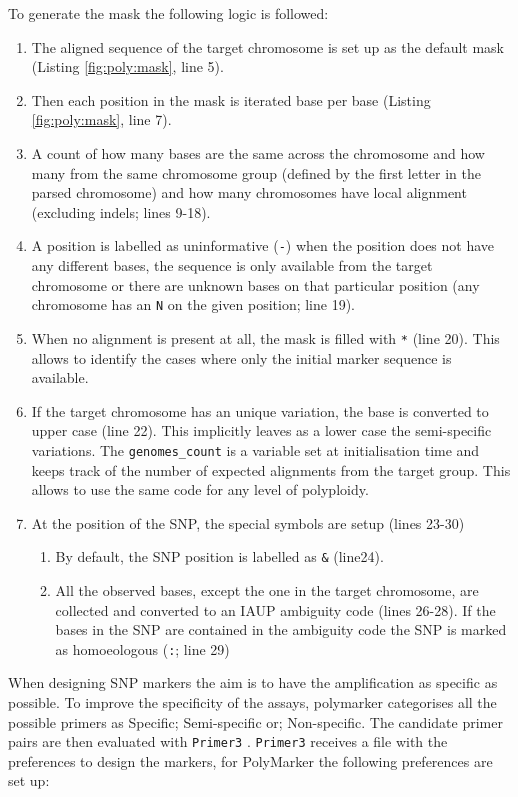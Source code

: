 To generate the mask the following logic is followed:
\begin{enumerate}
\item The aligned sequence of the target chromosome is set up as the default mask (Listing \ref{fig:poly:mask}, line 5).
\item Then each position in the mask is iterated base per base (Listing \ref{fig:poly:mask}, line 7).
\item A count of how many bases are the same across the chromosome and how many from the same chromosome group (defined by the first letter in the parsed chromosome) and how many chromosomes have local alignment (excluding \acrshort{indels}; lines 9-18).
\item  A position is labelled as uninformative (\verb|-|) when the position does not have any different bases, the sequence is only available from the target chromosome or there are unknown bases on that particular position (any chromosome has an \verb|N| on the given position; line 19).
\item When no alignment is present at all, the mask is filled with \verb|*| (line 20). This allows to identify the cases where only the initial marker sequence is available.
\item If the target chromosome has an unique variation, the base is converted to upper case (line 22). This implicitly leaves as a lower case the semi-specific variations. The \verb|genomes_count| is a variable set at initialisation time and keeps track of the number of expected alignments from the target group. This allows to use the same code for any level of polyploidy.  
\item At the position of the SNP, the special symbols are setup (lines 23-30)
\begin{enumerate}
\item By default, the SNP position is labelled as \verb|&| (line24).
\item All the observed bases, except the one in the target chromosome, are collected and converted to an IAUP ambiguity code \citep{Cornish-Bowden1985} (lines 26-28). If the bases in the SNP are contained in the ambiguity code the SNP is marked as homoeologous (\verb|:|; line 29)
\end{enumerate}
\end{enumerate}

When designing SNP markers the aim is to have the amplification as specific as possible. 
To improve the specificity of the assays, polymarker categorises all the possible primers as Specific; Semi-specific or; Non-specific. 
The candidate primer pairs are then evaluated with \texttt{Primer3} \citep{Rozen}. 
\texttt{Primer3} receives a file with the preferences to design the markers, for PolyMarker the following preferences are set up: 

